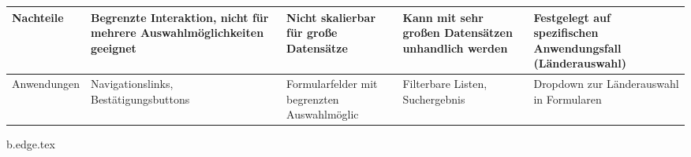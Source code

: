 \begin{table}[ht!]
{\begin{tabular}{ p{2.5cm} || p{2.8cm} | p{3.3cm} | p{3.3cm} | p{3.3cm} }
            \TBstrut Nachteile & Begrenzte Interaktion, nicht für mehrere Auswahlmöglichkeiten geeignet & Nicht skalierbar für große Datensätze & Kann mit sehr großen Datensätzen unhandlich werden & Festgelegt auf spezifischen Anwendungsfall (Länderauswahl) \\
            \hline
            \TBstrut Anwendungen & Navigationslinks, Bestätigungsbuttons & Formularfelder mit begrenzten Auswahlmöglic & Filterbare Listen, Suchergebnis & Dropdown zur Länderauswahl in Formularen \\
        \end{tabular}
    }
\end{table}

{b.edge.tex}







\cite{online}
